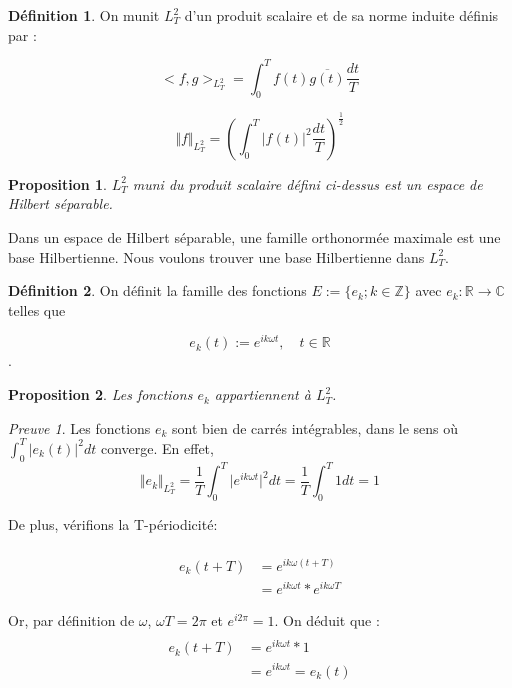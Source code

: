 \documentclass[]{article}
\newtheorem{myproposition}{Proposition}
\theoremstyle{remark}
\newtheorem{myproof}{Preuve}
\theoremstyle{definition}
\newtheorem{mydef}{Définition}
\begin{document}
			\begin{mydef} 
				On munit $L^2_T$ d'un produit scalaire et de sa norme induite définis par : 
			
			
				$$ <f,g>_{L^2_T} = \int_{0}^{T} f(t) \overline{g(t)}  \frac{dt}{T}$$
				
				$$ \Vert f \Vert _{L^2_T} = ( \int_0^T \vert f(t)\vert ^2\frac{dt}{T})^{\frac{1}{2}}$$	
				
			\end{mydef}
			
			\begin{myproposition}
				$L^2_T$ muni du produit scalaire défini ci-dessus est un espace de Hilbert séparable.
			\end{myproposition}
		 
			
			Dans un espace de Hilbert séparable, une famille orthonormée maximale est une base Hilbertienne. Nous voulons trouver une base Hilbertienne dans $L_T^2$.
			
			\begin{mydef}
				On définit la famille des fonctions $E:= \{e_k; k \in \mathbb{Z} \}$ avec $e_k:\mathbb{R} \to \mathbb{C}$ telles que
				
				$$e_k(t):=e^{ik\omega t}, \quad t\in \mathbb{R}$$.	
			\end{mydef}
			
			
			\begin{myproposition}
				Les fonctions $e_k$ appartiennent à $L^2_T$. 
			\end{myproposition}
			
			\begin{myproof}
				Les fonctions $e_k$ sont bien de carrés intégrables, dans le sens où $\int_0^T \vert e_k(t)\vert ^2 dt$ converge. En effet, 
				$$ \Vert e_k \Vert_{L_T^2} = \frac{1}{T}  \int_0^T \vert e^{ik\omega t} \vert ^2dt =  \frac{1}{T}  \int_0^T 1 dt = 1 $$
				
				
				De plus, vérifions la T-périodicité: 
				
				\begin{align*}
				\\ e_k(t+T) &= e^{ik\omega(t+T)}
				\\ & = e^{ik\omega t} * e^{ik\omega T}
				\end{align*}
				
				Or, par définition de $\omega$, $\omega T = 2\pi$ et $e^{i2\pi}= 1$. On déduit que : 
				\begin{align*}
				\\ e_k(t+T) &= e^{ik\omega t}*1 
				\\ &= e^{ik\omega t} = e_k(t) 
				\end{align*}
				
			\end{myproof}
			
\end{document}
